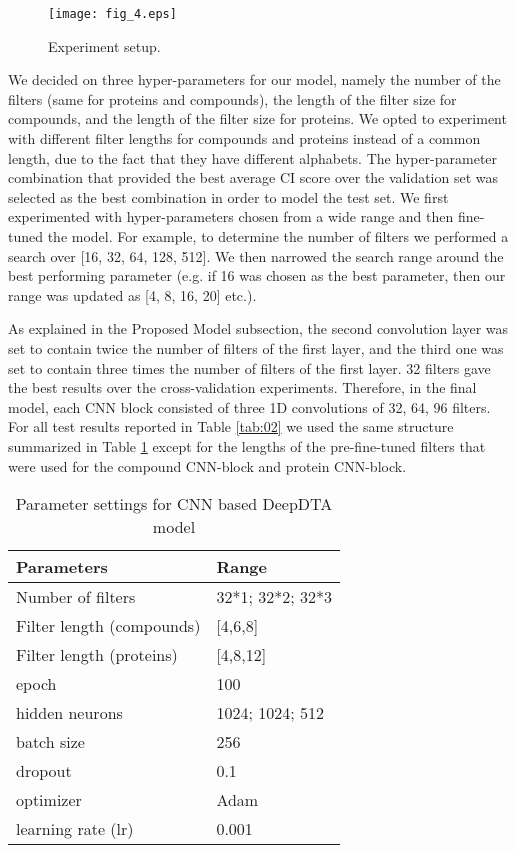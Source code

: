 \documentclass[11pt,letterpaper]{article}
\begin{document}
\begin{figure}[h]\centerline{\texttt{[image: fig\_4.eps]}}
\caption{Experiment setup.}\label{fig:04}
\end{figure}

We decided on three hyper-parameters for our model,  namely the number of the filters (same for proteins and compounds), the length of the filter size for compounds, and the length of the filter size for proteins.  We opted to experiment with different filter lengths for compounds and proteins instead of a common length, due to the fact that they have different alphabets. The  hyper-parameter combination that provided the best average CI score over the validation set was selected as the best combination in order to model the test set.  We first experimented with hyper-parameters chosen from a wide range and then fine-tuned the model. For example, to determine the number of filters we performed a search over [16, 32, 64, 128, 512].  We then narrowed the search range around the best performing parameter (e.g. if 16 was chosen as the best parameter, then our range was updated as [4, 8, 16, 20] etc.). 

As explained in the Proposed Model subsection, the second convolution layer was set to contain twice the number of filters of the first layer, and the third one was set to contain three times the number of filters of the first layer. 32 filters gave the best results over the cross-validation experiments. Therefore, in the final model, each CNN block consisted of three 1D convolutions of 32, 64, 96 filters. For all test results reported in Table \ref{tab:02} we used the same structure summarized in Table \ref{tab:paramss1} except for the lengths of the pre-fine-tuned filters that were used for the compound CNN-block and protein CNN-block.  


\begin{table}[H]
\centering
\caption{Parameter settings for CNN based DeepDTA model}
\label{tab:paramss1}
\begin{tabular}{ll}
\hline
\textbf{Parameters} & \textbf{Range}  \\ \hline
Number of filters      & 32*1; 32*2; 32*3   \\ \hline
Filter length (compounds)        &   [4,6,8]  \\ \hline
Filter length (proteins) & [4,8,12]  \\ \hline
epoch & 100  \\ \hline
hidden neurons & 1024; 1024; 512  \\ \hline
batch size & 256   \\ \hline
dropout & 0.1 \\ \hline
optimizer & Adam \\ \hline
learning rate (lr) & 0.001  \\ \hline

\end{tabular}
\end{table}
\end{document}
